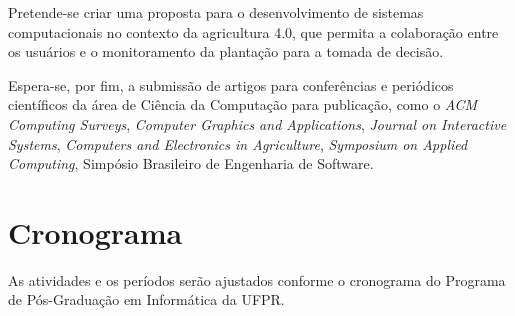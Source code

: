 \documentclass[12pt]{article}
\begin{document}
Pretende-se criar uma proposta para o desenvolvimento de sistemas computacionais no contexto da agricultura 4.0, que permita a colaboração entre os usuários e o monitoramento da plantação para a tomada de decisão.

Espera-se, por fim, a submissão de artigos para conferências e periódicos científicos da área de Ciência da Computação para publicação, como o \textit{ACM Computing Surveys}, \textit{Computer Graphics and Applications}, \textit{Journal on Interactive Systems}, \textit{Computers and Electronics in Agriculture}, \textit{Symposium on Applied Computing}, Simpósio Brasileiro de Engenharia de Software.

\section{Cronograma}
\label{sec:cronograma}

As atividades e os períodos serão ajustados conforme o cronograma do Programa de Pós-Graduação em Informática da UFPR.
\end{document}
